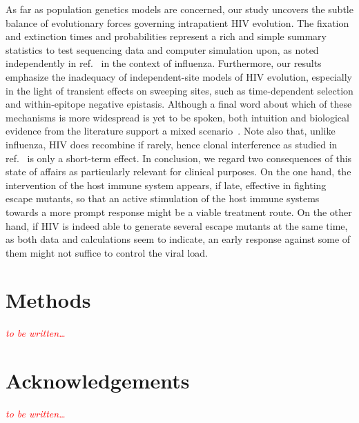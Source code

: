 \documentclass[rmp, twocolumn]{revtex4}
\newcommand{\comment}[1]{\textit{\textcolor{red}{#1}}}
\begin{document}
As far as population genetics models are concerned, our study uncovers the
subtle balance of evolutionary forces governing intrapatient HIV evolution. The
fixation and extinction times and probabilities represent a rich and simple
summary statistics to test sequencing data and computer simulation upon, as
noted independently in ref.~\citep{strelkowa_clonal_2012} in the context of
influenza. Furthermore, our results emphasize the inadequacy of independent-site
models of HIV evolution, especially in the light of transient effects on
sweeping sites, such as time-dependent selection and within-epitope negative
epistasis. Although a final word about which of these mechanisms is more
widespread is yet to be spoken, both intuition and biological evidence from the
literature support a mixed scenario~\citep{richman_rapid_2003,
moore_limited_2009}. Note also that, unlike influenza, HIV does recombine if
rarely, hence clonal interference as studied in
ref.~\citep{strelkowa_clonal_2012} is only a short-term effect. In conclusion,
we regard two consequences of this state of affairs as particularly relevant for
clinical purposes. On the one hand, the intervention of the host immune system
appears, if late, effective in fighting escape mutants, so that an active
stimulation of the host immune systems towards a more prompt response might be a
viable treatment route. On the other hand, if HIV is indeed able to generate
several escape mutants at the same time, as both data and calculations seem to
indicate, an early response against some of them might not suffice to control
the viral load.

\section{Methods}
\comment{to be written\dots}
\section*{Acknowledgements}
\comment{to be written\dots}




\end{document}

